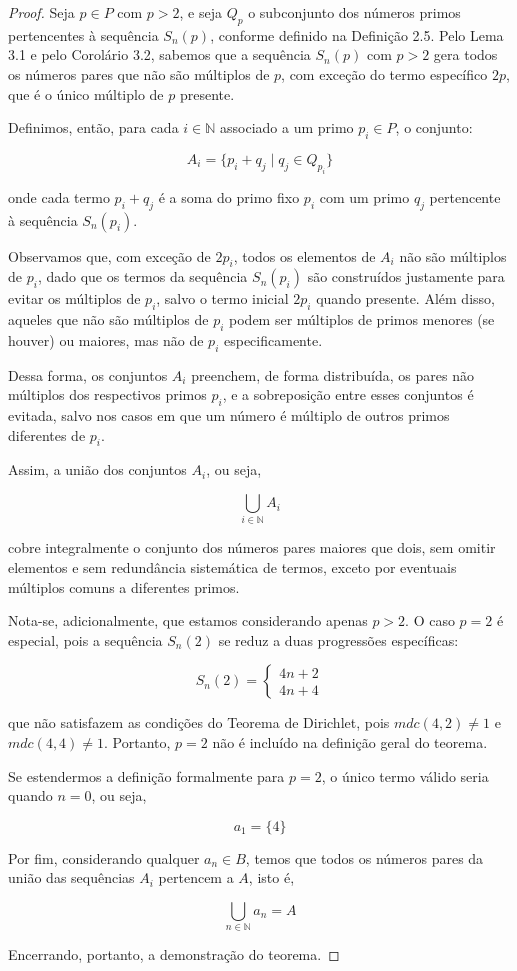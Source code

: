 \documentclass[a4paper,11pt]{article}
\theoremstyle{definition}
\theoremstyle{remark}
\begin{document}
	\begin{proof}
		Seja \(p \in P\) com \(p > 2\), e seja \(Q_p\) o subconjunto dos números primos pertencentes à sequência \(S_n(p)\), conforme definido na Definição 2.5. Pelo Lema 3.1 e pelo Corolário 3.2, sabemos que a sequência \(S_n(p)\) com \(p > 2\) gera todos os números pares que não são múltiplos de \(p\), com exceção do termo específico \(2p\), que é o único múltiplo de \(p\) presente.
		
		Definimos, então, para cada \(i \in \mathbb{N}\) associado a um primo \(p_i \in P\), o conjunto:
		
		\[
		A_i = \{p_i + q_j \mid q_j \in Q_{p_i}\}
		\]
		
		onde cada termo \(p_i + q_j\) é a soma do primo fixo \(p_i\) com um primo \(q_j\) pertencente à sequência \(S_n(p_i)\).
		
		Observamos que, com exceção de \(2p_i\), todos os elementos de \(A_i\) não são múltiplos de \(p_i\), dado que os termos da sequência \(S_n(p_i)\) são construídos justamente para evitar os múltiplos de \(p_i\), salvo o termo inicial \(2p_i\) quando presente. Além disso, aqueles que não são múltiplos de \(p_i\) podem ser múltiplos de primos menores (se houver) ou maiores, mas não de \(p_i\) especificamente.
		
		Dessa forma, os conjuntos \(A_i\) preenchem, de forma distribuída, os pares não múltiplos dos respectivos primos \(p_i\), e a sobreposição entre esses conjuntos é evitada, salvo nos casos em que um número é múltiplo de outros primos diferentes de \(p_i\).
		
		Assim, a união dos conjuntos \(A_i\), ou seja,
		
		\[
		\bigcup_{i \in \mathbb{N}} A_i
		\]
		
		cobre integralmente o conjunto dos números pares maiores que dois, sem omitir elementos e sem redundância sistemática de termos, exceto por eventuais múltiplos comuns a diferentes primos.
		
		Nota-se, adicionalmente, que estamos considerando apenas \(p > 2\). O caso \(p = 2\) é especial, pois a sequência \(S_n(2)\) se reduz a duas progressões específicas:
		
		\[
		S_n(2) =
		\begin{cases}
			4n + 2 \\
			4n + 4
		\end{cases}
		\]
		
		que não satisfazem as condições do Teorema de Dirichlet, pois \(mdc(4,2) \neq 1\) e \(mdc(4,4) \neq 1\). Portanto, \(p = 2\) não é incluído na definição geral do teorema.
		
		Se estendermos a definição formalmente para \(p = 2\), o único termo válido seria quando \(n = 0\), ou seja,
		
		\[
		a_1 = \{4\}
		\]
		
		Por fim, considerando qualquer \(a_n \in B\), temos que todos os números pares da união das sequências \(A_i\) pertencem a \(A\), isto é,
		
		\[
		\bigcup_{n \in \mathbb{N}} a_n = A
		\]
		
		Encerrando, portanto, a demonstração do teorema.
	\end{proof}
	
\end{document}
